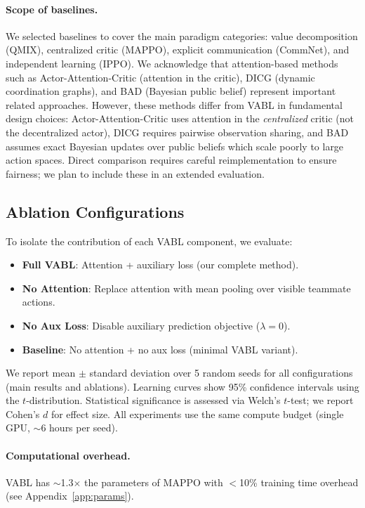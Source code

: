 \documentclass{article}
\theoremstyle{plain}
\theoremstyle{definition}
\theoremstyle{remark}
\begin{document}
\paragraph{Scope of baselines.}
We selected baselines to cover the main paradigm categories: value decomposition (QMIX), centralized critic (MAPPO), explicit communication (CommNet), and independent learning (IPPO). We acknowledge that attention-based methods such as Actor-Attention-Critic \cite{iqbal2019actor} (attention in the critic), DICG \cite{li2020deep} (dynamic coordination graphs), and BAD \cite{foerster2019bad} (Bayesian public belief) represent important related approaches. However, these methods differ from VABL in fundamental design choices: Actor-Attention-Critic uses attention in the \emph{centralized} critic (not the decentralized actor), DICG requires pairwise observation sharing, and BAD assumes exact Bayesian updates over public beliefs which scale poorly to large action spaces. Direct comparison requires careful reimplementation to ensure fairness; we plan to include these in an extended evaluation.

\subsection{Ablation Configurations}
To isolate the contribution of each VABL component, we evaluate:
\begin{itemize}
\item \textbf{Full VABL}: Attention + auxiliary loss (our complete method).
\item \textbf{No Attention}: Replace attention with mean pooling over visible teammate actions.
\item \textbf{No Aux Loss}: Disable auxiliary prediction objective ($\lambda = 0$).
\item \textbf{Baseline}: No attention + no aux loss (minimal VABL variant).
\end{itemize}

We report mean $\pm$ standard deviation over 5 random seeds for all configurations (main results and ablations). Learning curves show 95\% confidence intervals using the $t$-distribution. Statistical significance is assessed via Welch's $t$-test; we report Cohen's $d$ for effect size. All experiments use the same compute budget (single GPU, $\sim$6 hours per seed).

\paragraph{Computational overhead.}
VABL has $\sim$1.3$\times$ the parameters of MAPPO with $<$10\% training time overhead (see Appendix~\ref{app:params}).
\end{document}
